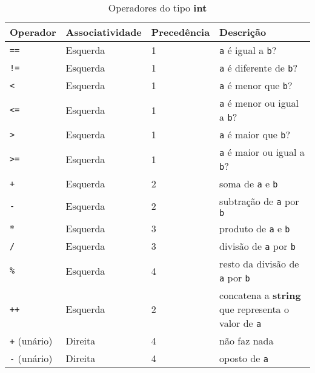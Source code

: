\begin{table}[!h]
    \begin{tabular}{@{}llll@{}}
        \toprule
        Operador                 & Associatividade & Precedência & Descrição                                                         \\
        \midrule
        \texttt{==}              & Esquerda        & 1           & \texttt{a} é igual a \texttt{b}?                                  \\
        \texttt{!=}              & Esquerda        & 1           & \texttt{a} é diferente de \texttt{b}?                             \\
        \texttt{\textless{}}     & Esquerda        & 1           & \texttt{a} é menor que \texttt{b}?                                \\
        \texttt{\textless{}=}    & Esquerda        & 1           & \texttt{a} é menor ou igual a \texttt{b}?                         \\
        \texttt{\textgreater{}}  & Esquerda        & 1           & \texttt{a} é maior que \texttt{b}?                                \\
        \texttt{\textgreater{}=} & Esquerda        & 1           & \texttt{a} é maior ou igual a \texttt{b}?                         \\
        \texttt{+}               & Esquerda        & 2           & soma de \texttt{a} e \texttt{b}                                   \\
        \texttt{-}               & Esquerda        & 2           & subtração de \texttt{a} por \texttt{b}                            \\
        \texttt{$*$}             & Esquerda        & 3           & produto de \texttt{a} e \texttt{b}                                \\
        \texttt{/}               & Esquerda        & 3           & divisão de \texttt{a} por \texttt{b}                              \\
        \texttt{\%}              & Esquerda        & 4           & resto da divisão de \texttt{a} por \texttt{b}                    \\
        \texttt{++}              & Esquerda        & 2           & concatena a \textbf{string} que representa o valor de \texttt{a}  \\
        \texttt{+} (unário)      & Direita         & 4           & não faz nada                                                      \\
        \texttt{-} (unário)      & Direita         & 4           & oposto de \texttt{a}                                              \\
    \end{tabular}
    \caption{Operadores do tipo \textbf{int}}
    \label{tab:operadores-int}
\end{table}

